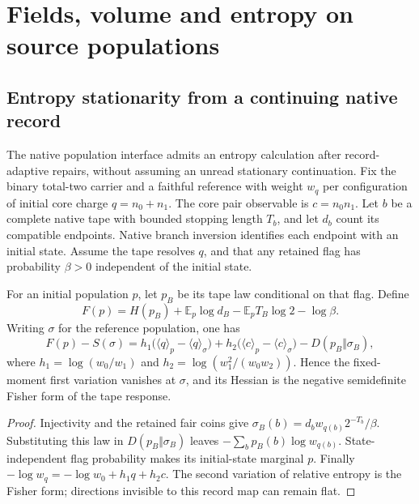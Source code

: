 \documentclass[11pt]{article}
\begin{document}







\section{Fields, volume and entropy on source populations}
\label{app:source-fields-entropy}







\subsection{Entropy stationarity from a continuing native record}
\label{sec:continuing-record-entropy}

The native population interface admits an entropy calculation after
record-adaptive repairs, without assuming an unread stationary continuation.
Fix the binary total-two carrier and a faithful reference with weight $w_q$
per configuration of initial core charge $q=n_0+n_1$. The core pair
observable is $c=n_0n_1$. Let $b$ be a complete native tape with bounded
stopping length $T_b$, and let $d_b$ count its compatible endpoints.
Native branch inversion identifies each endpoint with an initial state.
Assume the tape resolves $q$, and that any retained flag has probability
$\beta>0$ independent of the initial state.

\begin{proposition}
For an initial population $p$, let $p_B$ be its tape law conditional on that
flag. Define
\[
 F(p)=H(p_B)+\mathbb E_p\log d_B
       -\mathbb E_p T_B\log2-\log\beta.
\]
Writing $\sigma$ for the reference population, one has
\[
 F(p)-S(\sigma)
 =h_1\bigl(\langle q\rangle_p-\langle q\rangle_\sigma\bigr)
  +h_2\bigl(\langle c\rangle_p-\langle c\rangle_\sigma\bigr)
  -D(p_B\Vert\sigma_B),
\]
where $h_1=\log(w_0/w_1)$ and $h_2=\log(w_1^2/(w_0w_2))$.
Hence the fixed-moment first variation vanishes at $\sigma$, and its
Hessian is the negative semidefinite Fisher form of the tape response.
\end{proposition}
\begin{proof}
Injectivity and the retained fair coins give
$\sigma_B(b)=d_b w_{q(b)}2^{-T_b}/\beta$.
Substituting this law in $D(p_B\Vert\sigma_B)$ leaves
$-\sum_b p_B(b)\log w_{q(b)}$.
State-independent flag probability makes its initial-state marginal $p$.
Finally $-\log w_q=-\log w_0+h_1q+h_2c$.
The second variation of relative entropy is the Fisher form; directions
invisible to this record map can remain flat.
\end{proof}
\end{document}
